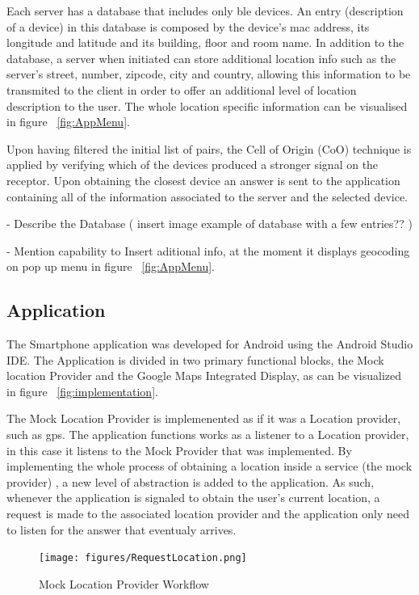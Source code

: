 \documentclass[a4paper]{IEEEtran}
\begin{document}
Each server has a database that includes only ble devices. An entry (description of a device) in this database is composed by the device's mac address, its longitude and latitude and its building, floor and room name. In addition to the database, a server when initiated can store additional location info such as the server's street, number, zipcode, city and country, allowing this information to be transmited to the client in order to offer an additional level of location description to the user. The whole location specific information can be visualised in figure ~\ref{fig:AppMenu}.

Upon having filtered the initial list of pairs, the Cell of Origin (CoO) technique is applied by verifying which of the devices produced a stronger signal on the receptor. Upon obtaining the closest device an answer is sent to the application containing all of the information associated to the server and the selected device.


- Describe the Database ( insert image example of database with a few entries?? )

- Mention capability to Insert aditional info, at the moment it displays geocoding on pop up menu in figure ~\ref{fig:AppMenu}.



\subsection{ Application}
\label{subsec:app}

The Smartphone application was developed for Android using the Android Studio IDE. The Application is divided in two primary functional blocks, the Mock location Provider and the Google Maps Integrated Display, as can be visualized in figure ~\ref{fig:implementation}.

The Mock Location Provider is implemenented as if it was a Location provider, such as gps. The application functions works as a listener to a Location provider, in this case it listens to the Mock Provider that was implemented. By implementing the whole process of obtaining a location inside a service (the mock provider) , a new level of abstraction is added to the application. As such, whenever the application is signaled to obtain the user's current location, a request is made to the associated location provider and the application only need to listen for the answer that eventualy arrives.

\begin{figure}
	\centering
		\texttt{[image: figures/RequestLocation.png]}
	\caption[Mock Location Provider Workflow]{Mock Location Provider Workflow}
	\label{fig:MockProvider}
\end{figure}
\end{document}
